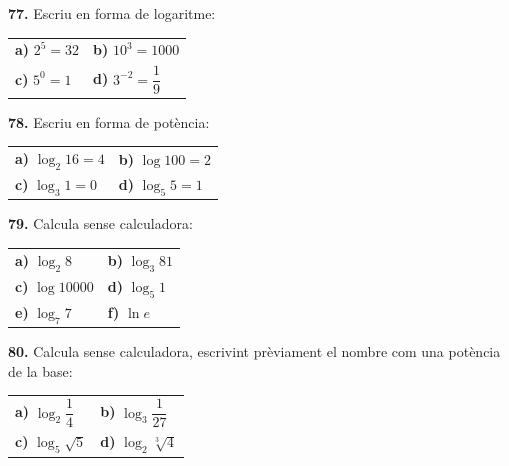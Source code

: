 \documentclass[13pt,a4paper]{extarticle}
\begin{document}
\par\noindent\begin{minipage}{\linewidth}
\textbf{77.} Escriu en forma de logaritme:\par

\begin{tabular}{@{}p{.46\linewidth}p{.46\linewidth}@{}}
\textbf{a)} $2^5=32$ & \textbf{b)} $10^3=1000$ \\[2pt]
\textbf{c)} $5^0=1$ & \textbf{d)} $3^{-2}=\dfrac{1}{9}$ \\[2pt]
\end{tabular}\par
\end{minipage}\par\vspace{1.6mm}
\par\noindent\begin{minipage}{\linewidth}
\textbf{78.} Escriu en forma de potència:\par

\begin{tabular}{@{}p{.46\linewidth}p{.46\linewidth}@{}}
\textbf{a)} $\log_2 16=4$ & \textbf{b)} $\log 100=2$ \\[2pt]
\textbf{c)} $\log_3 1=0$ & \textbf{d)} $\log_5 5=1$ \\[2pt]
\end{tabular}\par
\end{minipage}\par\vspace{1.6mm}
\par\noindent\begin{minipage}{\linewidth}
\textbf{79.} Calcula sense calculadora:\par

\begin{tabular}{@{}p{.46\linewidth}p{.46\linewidth}@{}}
\textbf{a)} $\log_2 8$ & \textbf{b)} $\log_3 81$ \\[2pt]
\textbf{c)} $\log 10000$ & \textbf{d)} $\log_5 1$ \\[2pt]
\textbf{e)} $\log_7 7$ & \textbf{f)} $\ln e$ \\[2pt]
\end{tabular}\par
\end{minipage}\par\vspace{1.6mm}
\par\noindent\begin{minipage}{\linewidth}
\textbf{80.} Calcula sense calculadora, escrivint prèviament el nombre com una potència de la base:\par

\begin{tabular}{@{}p{.46\linewidth}p{.46\linewidth}@{}}
\textbf{a)} $\log_2 \dfrac{1}{4}$ & \textbf{b)} $\log_3 \dfrac{1}{27}$ \\[2pt]
\textbf{c)} $\log_5 \sqrt5$ & \textbf{d)} $\log_2 \sqrt[3]{4}$ \\[2pt]
\end{tabular}\par
\end{minipage}\par\vspace{1.6mm}
\end{document}
